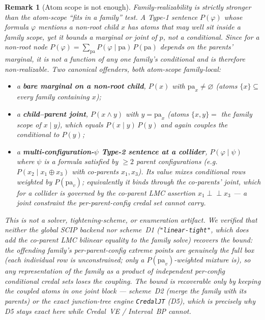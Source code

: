 \documentclass[11pt]{article}
\newtheorem{remark}{Remark}
\newcommand{\indep}{\perp\!\!\!\perp}
\newcommand{\pa}{\mathrm{pa}}
\begin{document}
\begin{remark}[Atom scope is not enough]\label{rem:scope}
Family-realizability is strictly stronger than the atom-scope ``fits in a family'' test. A Type-1
sentence $P(\varphi)$ whose formula $\varphi$ mentions a \emph{non-root} child $x$ has atoms that may
well sit inside a family scope, yet it bounds a \emph{marginal or joint} of $p$, not a conditional.
Since for a non-root node $P(\varphi)=\sum_{\pa}P(\varphi\mid\pa)\,P(\pa)$ depends on the parents'
marginal, it is not a function of any one family's conditional and is therefore non-realizable. Two
canonical offenders, both atom-scope family-local:
\begin{itemize}
  \item a \textbf{bare marginal on a non-root child}, $P(x)$ with $\pa_x\neq\varnothing$ (atoms
    $\{x\}\subseteq$ every family containing $x$);
  \item a \textbf{child--parent joint}, $P(x\wedge y)$ with $y=\pa_x$ (atoms $\{x,y\}=$ the family
    scope of $x\mid y$), which equals $P(x\mid y)\,P(y)$ and again couples the conditional to $P(y)$;
  \item a \textbf{multi-configuration-$\psi$ Type-2 sentence at a collider}, $P(\varphi\mid\psi)$
    where $\psi$ is a formula satisfied by $\ge2$ parent configurations (e.g.\
    $P(x_2\mid x_1\oplus x_3)$ with co-parents $x_1,x_3$). Its value mixes conditional rows weighted
    by $P(\pa_v)$; equivalently it binds through the co-parents' joint, which for a collider is
    governed by the co-parent LMC assertion $x_1\indep x_3$ --- a \emph{joint} constraint the
    per-parent-config credal set cannot carry.
\end{itemize}
\emph{This is not a solver, tightening-scheme, or enumeration artifact.} We verified that neither the
global SCIP backend nor scheme~D1 (\texttt{"linear-tight"}, which \emph{does} add the co-parent LMC
bilinear equality to the family solve) recovers the bound: the offending family's per-parent-config
extreme points are genuinely the full box (each individual row is unconstrained; only a
$P(\pa_v)$-weighted mixture is), so any representation of the family as a product of independent
per-config conditional credal sets loses the coupling. The bound is recoverable only by keeping the
coupled atoms in one joint block --- scheme~D2 (merge the family with its parents) or the exact
junction-tree engine \texttt{CredalJT} (D5), which is precisely why D5 stays exact here while
Credal~VE / Interval~BP cannot.
\end{remark}
\end{document}
